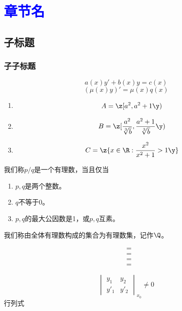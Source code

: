 \newpage

\section{\huge \textcolor{blue}{章节名}}

\subsection{\LARGE 子标题}

\subsubsection{\large 子子标题}

\hspace*{1em}
{\Large
\begin{equation}
a(x) y' + b(x) y = c(x)
\end{equation}
}
{\Large \[ (\mu(x) y)' = \mu(x) q(x) \]}



\begin{enumerate}
    \item 
    \[  A=\z[a^2,a^2+1\y)    \]
    
    \item 
    \[ B=\z[\frac{a^2}{\sqrt[3]{b}},\frac{a^2+1}{\sqrt[3]{b}}\y) \]
    
    \item
    \[ C=\z\{x\in\R: \frac{x^2}{x^2+1}>1 \y\}    \]
\end{enumerate}

\begin{definition}[有理数]
我们称$p/q$是一个有理数，当且仅当
\begin{enumerate}
    \item $p,q$是两个整数。
    \item $q$不等于0。
    \item $p,q$的最大公因数是1，或$p,q$互素。
\end{enumerate}

我们称由全体有理数构成的集合为有理数集，记作$\Q$。
\end{definition}

\begin{align*}
    &=  \\
    &=   \\
    &= \\
    &=      
\end{align*}

\[
\begin{vmatrix}
    y_1 & y_2 \\
    y'_1 & y'_2
\end{vmatrix}_{x_0}
\neq 0
\]
行列式


